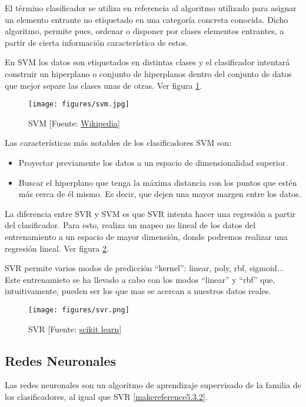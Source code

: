 	El término clasificador se utiliza en referencia al algoritmo utilizado para asignar un elemento entrante no etiquetado en una categoría concreta conocida. Dicho algoritmo, permite pues, ordenar o disponer por clases elementos entrantes, a partir de cierta información característica de estos.

	En SVM los datos son etiquetados en distintas clases y el clasificador intentará construir un hiperplano o conjunto de hiperplanos dentro del conjunto de datos que mejor separe las clases unas de otras. Ver figura \ref{svm}.

	\begin{figure}[htb]
		\begin{center}
			\texttt{[image: figures/svm.jpg]}
			\caption{SVM [Fuente: \href{www.wikipedia.org}{Wikipedia}] \label{svm}}
		\end{center}
	\end{figure}

	Las características más notables de los clasificadores SVM son:
	\begin{itemize}
		\item Proyectar previamente los datos a un espacio de dimensionalidad superior.
		\item Buscar el hiperplano que tenga la máxima distancia con los puntos que estén más cerca de él mismo. Es decir, que dejen una mayor margen entre los datos.
	\end{itemize}

	La diferencia entre SVR y SVM es que SVR intenta hacer una regresión a partir del clasificador. Para esto, realiza un mapeo no lineal de los datos del entrenamiento a un espacio de mayor dimensión, donde podremos realizar una regresión lineal. Ver figura \ref{svr}.

	SVR permite varios modos de predicción ``kernel'': linear, poly, rbf, sigmoid...
	Este entrenamieto se ha llevado a cabo con los modos ``linear'' y ``rbf'' que, intuitivamente, pueden ser los que mas se acercan a nuestros datos reales.

	\begin{figure}[htb]
		\begin{center}
			\texttt{[image: figures/svr.png]}
			\caption{SVR [Fuente: \href{http://scikit-learn.org/stable/auto_examples/svm/plot_svm_regression.html}{scikit learn}] \label{svr}}
		\end{center}
	\end{figure}
	
	\subsection{Redes Neuronales}
	\label{makereference5.3.3}
	Las redes neuronales son un algoritmo de aprendizaje supervisado de la familia de los clasificadores, al igual que SVR \ref{makereference5.3.2}.

